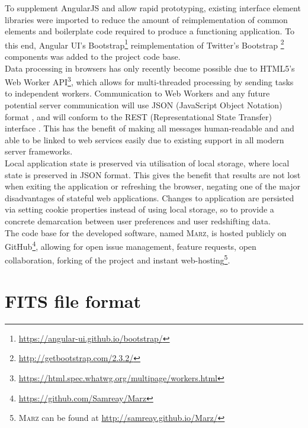 \documentclass[iop]{emulateapj}
\newcommand{\marz}{\textsc{Marz}}
\begin{document}
To supplement AngularJS and allow rapid prototyping, existing interface element libraries were imported to reduce the amount of reimplementation of common elements and boilerplate code required to produce a functioning application. To this end, Angular UI's Bootstrap\footnote{\url{https://angular-ui.github.io/bootstrap/}} reimplementation of Twitter's Bootstrap \footnote{\url{http://getbootstrap.com/2.3.2/}} components was added to the project code base.\\

Data processing in browsers has only recently become possible due to HTML5's Web Worker API\footnote{\url{https://html.spec.whatwg.org/multipage/workers.html}}, which allows for multi-threaded processing by sending tasks to independent workers. Communication to Web Workers and any future potential server communication will use JSON (JavaScript Object Notation) format \citep{bray2014javascript}, and will conform to the REST (Representational State Transfer) interface \citep{windley11rest}. This has the benefit of making all messages human-readable and and able to be linked to web services easily due to existing support in all modern server frameworks.\\


Local application state is preserved via utilisation of local storage, where local state is preserved in JSON format. This gives the benefit that results are not lost when exiting the application or refreshing the browser, negating one of the major disadvantages of stateful web applications. Changes to application are persisted via setting cookie properties instead of using local storage, so to provide a concrete demarcation between user preferences and user redshifting data.\\



The code base for the developed software, named \marz{}, is hosted publicly on GitHub\footnote{\url{https://github.com/Samreay/Marz}}, allowing for open issue management, feature requests, open collaboration, forking of the project and instant web-hosting\footnote{\marz{} can be found at \url{http://samreay.github.io/Marz/}}.







\section{FITS file format}
\end{document}
